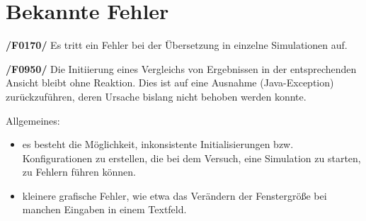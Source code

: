 \section{Bekannte Fehler}

\textbf{/F0170/}
Es tritt ein Fehler bei der Übersetzung in einzelne Simulationen auf.

\textbf{/F0950/}
Die Initiierung eines Vergleichs von Ergebnissen in der entsprechenden Ansicht bleibt ohne Reaktion. Dies ist auf eine Ausnahme (Java-Exception) zurückzuführen, deren Ursache bislang nicht behoben werden konnte.

Allgemeines:
\begin{itemize}
\item es besteht die Möglichkeit, inkonsistente Initialisierungen bzw. Konfigurationen zu erstellen, die bei dem Versuch, eine Simulation zu starten, zu Fehlern führen können.

\item kleinere grafische Fehler, wie etwa das Verändern der Fenstergröße bei manchen Eingaben in einem Textfeld.
\end{itemize}